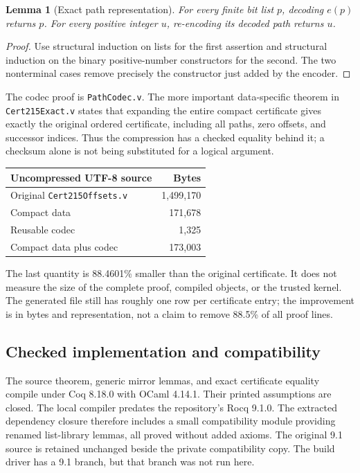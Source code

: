 \documentclass[11pt]{article}
\newtheorem{lemma}[theorem]{Lemma}
\theoremstyle{remark}\newtheorem{remark}[theorem]{Remark}
\newcommand{\code}[1]{\texttt{\small #1}}
\begin{document}
\begin{lemma}[Exact path representation]
For every finite bit list $p$, decoding $e(p)$ returns $p$. For every positive integer $u$, re-encoding its decoded path returns $u$.
\end{lemma}
\begin{proof}
Use structural induction on lists for the first assertion and structural induction on the binary positive-number constructors for the second. The two nonterminal cases remove precisely the constructor just added by the encoder.
\end{proof}

The codec proof is \code{PathCodec.v}. The more important data-specific theorem in \code{Cert215Exact.v} states that expanding the entire compact certificate gives exactly the original ordered certificate, including all paths, zero offsets, and successor indices. Thus the compression has a checked equality behind it; a checksum alone is not being substituted for a logical argument.

\begin{center}
\begin{tabular}{lr}
\toprule
Uncompressed UTF-8 source & Bytes \\
\midrule
Original \code{Cert215Offsets.v} & 1,499,170 \\
Compact data & 171,678 \\
Reusable codec & 1,325 \\
Compact data plus codec & 173,003 \\
\bottomrule
\end{tabular}
\end{center}
The last quantity is 88.4601\% smaller than the original certificate. It does not measure the size of the complete proof, compiled objects, or the trusted kernel. The generated file still has roughly one row per certificate entry; the improvement is in bytes and representation, not a claim to remove 88.5\% of all proof lines.

\subsection{Checked implementation and compatibility}

The source theorem, generic mirror lemmas, and exact certificate equality compile under Coq 8.18.0 with OCaml 4.14.1. Their printed assumptions are closed. The local compiler predates the repository's Rocq 9.1.0. The extracted dependency closure therefore includes a small compatibility module providing renamed list-library lemmas, all proved without added axioms. The original 9.1 source is retained unchanged beside the private compatibility copy. The build driver has a 9.1 branch, but that branch was not run here.
\end{document}
